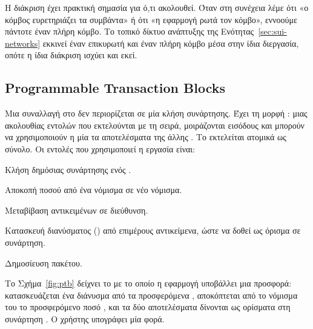 Η διάκριση έχει πρακτική σημασία για ό,τι ακολουθεί. Όταν στη συνέχεια λέμε ότι «ο κόμβος
ευρετηριάζει τα συμβάντα» ή ότι «η εφαρμογή ρωτά τον κόμβο», εννοούμε πάντοτε έναν πλήρη
κόμβο. Το τοπικό δίκτυο ανάπτυξης της Ενότητας~\ref{sec:sui-networks} εκκινεί έναν
επικυρωτή και έναν πλήρη κόμβο μέσα στην ίδια διεργασία, οπότε η ίδια διάκριση ισχύει και
εκεί.

\subsection{Programmable Transaction Blocks}
\label{sec:ptb}

Μια συναλλαγή στο  δεν περιορίζεται σε μία κλήση συνάρτησης. Έχει τη μορφή
: μιας ακολουθίας εντολών που εκτελούνται με τη
σειρά, μοιράζονται εισόδους και μπορούν να χρησιμοποιούν η μία τα αποτελέσματα της άλλης
\cite{sui-ptb}. Το  εκτελείται ατομικά ως σύνολο. Οι εντολές που χρησιμοποιεί η εργασία είναι:

\begin{description}[leftmargin=1.2em,itemsep=1pt]
  \item[\code{MoveCall}] Κλήση δημόσιας συνάρτησης ενός .
  \item[\code{SplitCoins}] Αποκοπή ποσού από ένα νόμισμα σε νέο νόμισμα.
  \item[\code{TransferObjects}] Μεταβίβαση αντικειμένων σε διεύθυνση.
  \item[\code{MakeMoveVec}] Κατασκευή διανύσματος () από επιμέρους
    αντικείμενα, ώστε να δοθεί ως όρισμα σε συνάρτηση.
  \item[\code{Publish}] Δημοσίευση πακέτου.
\end{description}

Το Σχήμα~\ref{fig:ptb} δείχνει το  με το οποίο η εφαρμογή υποβάλλει μια προσφορά:
κατασκευάζεται ένα διάνυσμα από τα προσφερόμενα , αποκόπτεται από το νόμισμα του
 το προσφερόμενο ποσό , και τα δύο αποτελέσματα δίνονται ως ορίσματα στη
συνάρτηση . Ο χρήστης υπογράφει μία φορά.

